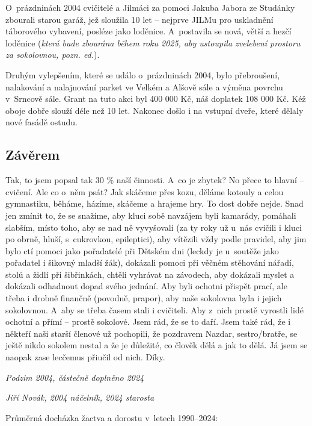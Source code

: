 \documentclass[a5paper, 12pt, twoside]{article}
\begin{document}
O~prázdninách 2004 cvičitelé a Jilmáci za pomoci Jakuba Jabora ze
Studánky zbourali starou garáž, jež sloužila 10 let -- nejprve JILMu pro
uskladnění táborového vybavení, posléze jako loděnice. A~postavila se
nová, větší a hezčí loděnice (\textit{která bude zbourána během roku 2025,
aby ustoupila zvelebení prostoru za sokolovnou, pozn. ed.}).

Druhým vylepšením, které se událo o~prázdninách 2004, bylo přebroušení,
nalakování a nalajnování parket ve Velkém a Alšově sále a výměna povrchu
v~Srncově sále. Grant na tuto akci byl 400 000 Kč, náš doplatek 108 000
Kč. Kéž oboje dobře slouží déle než 10 let. Nakonec došlo i na vstupní
dveře, které dělaly nové fasádě ostudu.

\subsection{Závěrem}

Tak, to jsem popsal tak 30 \% naší činnosti. A~co je zbytek? No přece to
hlavní -- cvičení. Ale co o~něm psát? Jak skáčeme přes kozu, děláme
kotouly a celou gymnastiku, běháme, házíme, skáčeme a hrajeme hry. To
dost dobře nejde. Snad jen zmínit to, že se snažíme, aby kluci sobě
navzájem byli kamarády, pomáhali slabším, místo toho, aby se nad ně
vyvyšovali (za ty roky už u~nás cvičili i kluci po obrně, hluší,
s~cukrovkou, epileptici), aby vítězili vždy podle pravidel, aby jim bylo
ctí pomoci jako pořadatelé při Dětském dni (leckdy je u~soutěže jako
pořadatel i šikovný mladší žák), dokázali pomoci při věčném stěhování
nářadí, stolů a židlí při šibřinkách, chtěli vyhrávat na závodech, aby
dokázali myslet a dokázali odhadnout dopad svého jednání. Aby byli
ochotni přispět prací, ale třeba i drobně finančně (povodně, prapor),
aby naše sokolovna byla i jejich sokolovnou. A~aby se třeba časem stali
i cvičiteli. Aby z~nich prostě vyrostli lidé ochotní a přímí -- prostě
sokolové. Jsem rád, že se to daří. Jsem také rád, že i někteří naši
starší členové už pochopili, že pozdravem Nazdar, sestro/bratře, se
ještě nikdo sokolem nestal a že je důležité, co člověk dělá a jak to
dělá. Já jsem se naopak zase lecčemus přiučil od nich. Díky.

\textit{Podzim 2004, částečně doplněno 2024}

\textit{Jiří Novák, 2004 náčelník, 2024 starosta}

Průměrná docházka žactva a dorostu v~letech 1990--2024:
\end{document}

